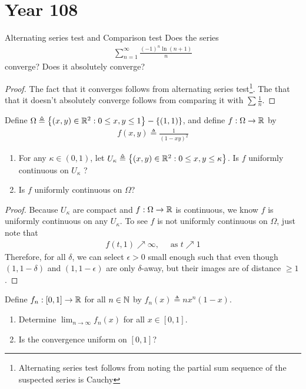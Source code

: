 \documentclass{report}
\begin{document}
\section{Year 108}
\begin{question}{Alternating series test and Comparison test}{}
Does the series
\begin{align*}
\sum_{n=1}^{\infty} \frac{(-1)^n \ln (n+1)}{n}
\end{align*}
converge? Does it absolutely converge? 
\end{question}
\begin{proof}
The fact that it converges follows from alternating series test\footnote{Alternating series test follows from noting the partial sum sequence of the suspected series is Cauchy}. The that that it doesn't absolutely converge follows from comparing it with $\sum \frac{1}{n}$.   
\end{proof}
\begin{question}{}{}
Define $\Omega \triangleq  \left\{ (x,y)\in\mathbb{R}^2 :0\leq x,y\leq 1 \right\}- \left\{ (1,1) \right\}$, and define $f:\Omega \rightarrow \mathbb{R}$ by 
\begin{align*}
f(x,y)\triangleq \frac{1}{(1-xy)^2}
\end{align*}
\begin{enumerate}[label=(\roman*)]
  \item For any $\kappa \in (0,1)$, let $U_\kappa\triangleq \left\{ (x,y)\in\mathbb{R}^2: 0\leq x,y\leq \kappa \right\}$. Is $f$ uniformly continuous on  $U_\kappa$ ?   
  \item Is $f$ uniformly continuous on $\Omega$? 
\end{enumerate}
\end{question}
\begin{proof}
Because $U_\kappa$ are compact and $f:\Omega \rightarrow \mathbb{R}$ is continuous, we know $f$ is uniformly continuous on any  $U_\kappa$.  To see $f$ is not uniformly continuous on $\Omega$, just note that 
\begin{align*}
f(t,1) \nearrow \infty,\quad \text{ as }t \nearrow 1
\end{align*}
Therefore, for all $\delta$, we can select $\epsilon >0$ small enough such that even though $(1,1-\delta)$ and $(1,1-\epsilon)$ are only $\delta$-away, but their images are of distance $\geq 1$. 
\end{proof}
\begin{question}{}{}
Define $f_n:[0,1]\rightarrow \mathbb{R}$ for all $n\in\mathbb{N}$ by $f_n(x)\triangleq nx^n(1-x)$. 
\begin{enumerate}[label=(\roman*)]
  \item Determine $\lim_{n\rightarrow  \infty} f_n(x)$ for all $x\in [0,1]$. 
  \item Is the convergence uniform on $[0,1]$? 
\end{enumerate}
\end{question}
\end{document}
